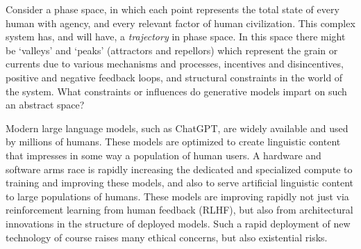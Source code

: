 \documentclass[11pt, oneside]{article}   	%
\begin{document}















Consider a phase space, in which each point represents the total state of every human with agency, and every relevant factor of human civilization.  This complex system has, and will have, a \emph{trajectory} in phase space.  In this space there might be `valleys' and `peaks' (attractors and repellors) which represent the grain or currents due to various mechanisms and processes, incentives and disincentives, positive and negative feedback loops, and structural constraints in the world of the system.  What constraints or influences do generative models impart on such an abstract space?

Modern large language models, such as ChatGPT, are widely available and used by millions of humans.  These models are optimized to create linguistic content that impresses in some way a population of human users.  A hardware and software arms race is rapidly increasing the dedicated and specialized compute to training and improving these models, and also to serve artificial linguistic content to large populations of humans.  These models are improving rapidly not just via reinforcement learning from human feedback (RLHF), but also from architectural innovations in the structure of deployed models.  Such a rapid deployment of new technology of course raises many ethical concerns, but also existential risks.
\end{document}
